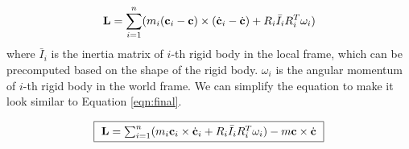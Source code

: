\begin{equation}
\mathbf{L} = \sum_{i=1}^n (m_i (\mathbf{c}_i - \mathbf{c}) \times (\dot{\mathbf{c}}_i -
\dot{\mathbf{c}}) + R_i \bar{I}_i R_i^T \omega_i)
\end{equation}
where $\bar{I}_i$ is the inertia matrix of $i$-th rigid body in the
local frame, which can be precomputed based on the shape of the rigid
body. $\omega_i$ is the angular momentum of $i$-th rigid body in the
world frame. We can simplify the equation to make it look similar to
Equation \ref{eqn:final}.

\begin{equation}
\framebox{
$\vc{L} = \sum_{i=1}^n (m_i \vc{c}_i \times \dot{\vc{c}}_i + R_i \bar{I}_i
R_i^T \omega_i) - m \vc{c} \times \dot{\vc{c}}$
}
\end{equation}
